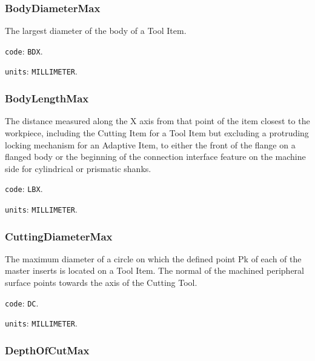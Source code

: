 \FloatBarrier




\subsubsection{BodyDiameterMax}
\label{sec:BodyDiameterMax}



The largest diameter of the body of a Tool Item.


\texttt{code}: \texttt{BDX}.


\texttt{units}: \texttt{MILLIMETER}.



\subsubsection{BodyLengthMax}
\label{sec:BodyLengthMax}



The distance measured along the X axis from that point of the item closest to the workpiece, including the Cutting Item for a Tool Item but excluding a protruding locking mechanism for an Adaptive Item, to either the front of the flange on a flanged body or the beginning of the connection interface feature on the machine side for cylindrical or prismatic shanks.


\texttt{code}: \texttt{LBX}.


\texttt{units}: \texttt{MILLIMETER}.



\subsubsection{CuttingDiameterMax}
\label{sec:CuttingDiameterMax}



The maximum diameter of a circle on which the defined point Pk of each of the master inserts is located on a Tool Item. The normal of the machined peripheral surface points towards the axis of the Cutting Tool.


\texttt{code}: \texttt{DC}.


\texttt{units}: \texttt{MILLIMETER}.



\subsubsection{DepthOfCutMax}
\label{sec:DepthOfCutMax}



